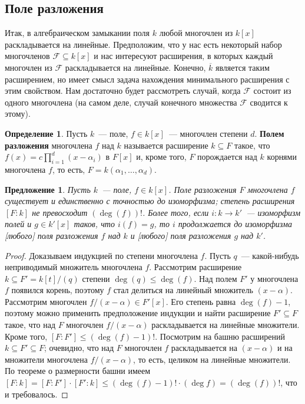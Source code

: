 \documentclass[a4paper,11pt]{scrartcl}
\theoremstyle{plain}
\newtheorem{proposition}[theorem]{Предложение}
\theoremstyle{definition}
\newtheorem{definition}[theorem]{Определение}
\newcommand\dfn[1]{\textbf{#1}}
\newcommand\mc{\mathcal}
\newcommand\sseq{\subseteq}
\begin{document}
\subsection{Поле разложения}

Итак, в алгебраическом замыкании поля $k$ любой многочлен из $k[x]$
раскладывается на линейные. Предположим, что у нас есть некоторый
набор многочленов $\mc F\sseq k[x]$ и нас интересуют расширения, в
которых каждый многочлен из $\mc F$ раскладывается на
линейные. Конечно, $\overline{k}$ является таким расширением, но имеет
смысл задача нахождения минимального расширения с этим свойством. Нам
достаточно будет рассмотреть случай, когда $\mc F$ состоит из одного
многочлена (на самом деле, случай конечного множества $\mc F$ сводится
к этому).

\begin{definition}
Пусть $k$~--- поле, $f\in k[x]$~--- многочлен степени $d$.
\dfn{Полем разложения} многочлена $f$ над $k$ называется расширение $k\sseq F$
такое, что $f(x)=c\prod_{i=1}^d(x-\alpha_i)$ в $F[x]$ и, кроме того,
$F$
порождается над $k$ корнями многочлена $f$, то есть,
$F=k(\alpha_1,\dots,\alpha_d)$.
\end{definition}

\begin{proposition}\label{splitting_field}
Пусть $k$~--- поле, $f\in k[x]$. Поле разложения $F$ многочлена $f$
существует и единственно с точностью до изоморфизма; степень
расширения $[F:k]$ не превосходит $(\deg(f))!$. Более того, если
$i\colon k\to k'$~--- изоморфизм полей и $g\in k'[x]$ таков, что
$i(f)=g$, то $i$ продолжается до изоморфизма [любого] поля разложения
$f$ над $k$ и [любого] поля разложения $g$ над $k'$.
\end{proposition}
\begin{proof}
Доказываем индукцией по степени многочлена $f$. Пусть $q$~---
какой-нибудь неприводимый множитель многочлена $f$. Рассмотрим
расширение $k\sseq F'=k[t]/(q)$ степени $\deg(q)\leq\deg(f)$. Над полем
$F'$ у многочлена $f$ появился корень, поэтому $f$ стал делиться на
линейный множитель $(x-\alpha)$. Рассмотрим многочлен $f/(x-\alpha)\in
F'[x]$. Его степень равна $\deg(f)-1$, поэтому можно применить
предположение индукции и найти расширение $F'\sseq F$ такое, что над
$F$ многочлен $f/(x-\alpha)$ раскладывается на линейные множители.
Кроме
того, $[F:F']\leq (\deg(f)-1)!$. Посмотрим на башню расширений $k\sseq
F'\sseq F$; очевидно, что над $F$ многочлен $f$ раскладывается на
$(x-\alpha)$ и на множители многочлена $f/(x-\alpha)$, то есть,
целиком на
линейные множители. По теореме о размерности башни имеем
$[F:k]=[F:F']\cdot [F':k]\leq (\deg(f)-1)!\cdot(\deg f)=(\deg(f))!$,
что и требовалось.
\end{proof}
\end{document}
